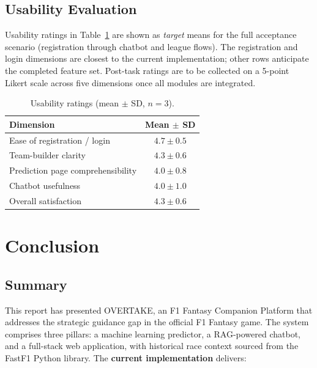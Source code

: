 \documentclass[12pt, a4paper, oneside]{report}
\begin{document}
\section{Usability Evaluation}

Usability ratings in Table~\ref{tab:usability} are shown as \emph{target}
means for the full acceptance scenario (registration through chatbot and
league flows). The registration and login dimensions are closest to the
current implementation; other rows anticipate the completed feature set.
Post-task ratings are to be collected on a 5-point Likert scale across five
dimensions once all modules are integrated.

\begin{table}[H]
\centering
\caption{Usability ratings (mean $\pm$ SD, $n=3$).}
\label{tab:usability}
\begin{tabularx}{\textwidth}{@{} l c @{}}
  \toprule
  \textbf{Dimension}               & \textbf{Mean $\pm$ SD} \\
  \midrule
  Ease of registration / login     & $4.7 \pm 0.5$ \\
  Team-builder clarity             & $4.3 \pm 0.6$ \\
  Prediction page comprehensibility & $4.0 \pm 0.8$ \\
  Chatbot usefulness               & $4.0 \pm 1.0$ \\
  Overall satisfaction             & $4.3 \pm 0.6$ \\
  \bottomrule
\end{tabularx}
\end{table}

\chapter{Conclusion}

\section{Summary}

This report has presented OVERTAKE, an F1 Fantasy Companion Platform that
addresses the strategic guidance gap in the official F1 Fantasy game. The
system comprises three pillars: a machine learning predictor, a RAG-powered
chatbot, and a full-stack web application, with historical race context sourced
from the FastF1 Python library. The \textbf{current implementation} delivers:
\end{document}
